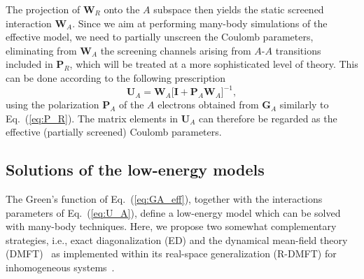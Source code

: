 \documentclass[aps,prx,twocolumn,superscriptaddress]{revtex4-2}
\newcommand{\AV}[1]{{\textcolor{purple}{#1}}}
\begin{document}
The projection of $\mathbf{W}_R$ onto the $A$ subspace then yields 
the static screened interaction $\mathbf{W}_A$. 
Since we aim at performing many-body simulations of the effective model, we need to partially unscreen the Coulomb parameters, eliminating from $\mathbf{W}_A$ the screening channels arising from $A$-$A$ transitions included in $\mathbf{P}_R$, which will be treated at a more sophisticated level of theory. 
This can be done according to the following prescription
\begin{equation} \label{eq:U_A}
    \mathbf{U}_A = \mathbf{W}_A \big[ \mathbf{I}+\mathbf{P}_A\mathbf{W}_A \big] ^{-1},
\end{equation}
using the polarization $\mathbf{P}_A$ of the $A$ electrons obtained from $\mathbf{G}_A$ similarly to Eq.~(\ref{eq:P_R}). The matrix elements in $\mathbf{U}_A$ can therefore be regarded as the effective (partially screened) Coulomb parameters.



\subsection{Solutions of the low-energy models}\label{sec:many-body}

The Green's function of Eq.~(\ref{eq:GA_eff}), together with the interactions parameters of Eq.~(\ref{eq:U_A}), 
define a low-energy model which can be solved with many-body techniques. 
Here, we propose two somewhat complementary strategies, i.e., exact diagonalization (ED) 
and the dynamical mean-field theory (DMFT)~\cite{georgesRMP68} 
as implemented within its real-space generalization (R-DMFT) for inhomogeneous systems~\cite{florens2007nanoscale,snoekNJP10,valliPRL104,valliPRB82,jacobPRB82}.
\end{document}
